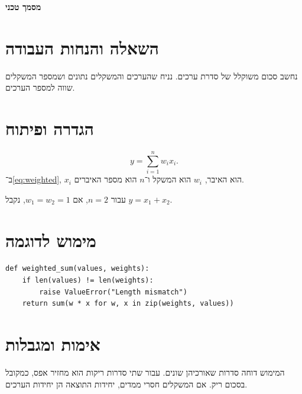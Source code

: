 \def\lakitdocumentclass{article}
\def\lakitclassoptions{11pt,a4paper}
\def\lakitgeometryoptions{margin=2.1cm,headheight=14pt}
\def\lakitlinespread{1.18}
\def\lakitparagraphstyle{block}




{\LARGE\sffamily\bfseries\noindent מסמך טכני\par}\medskip
\section{השאלה והנחות העבודה}
נחשב סכום משוקלל של סדרת ערכים. נניח שהערכים והמשקלים נתונים ושמספר
המשקלים שווה למספר הערכים.
\section{הגדרה ופיתוח}
\begin{equation}\label{eq:weighted}
y=\sum_{i=1}^{n}w_i x_i.
\end{equation}
ב־\eqref{eq:weighted}, $x_i$ הוא האיבר, $w_i$ הוא המשקל ו־$n$ הוא מספר
האיברים.
\begin{exbox}[frametitle={בדיקה פשוטה}]
עבור $n=2$, אם $w_1=w_2=1$, נקבל $y=x_1+x_2$.
\end{exbox}
\section{מימוש לדוגמה}
\begin{codebox}[frametitle={\en{Python}}]
\begin{asmblock}
\begin{lstlisting}[style=pystyle]
def weighted_sum(values, weights):
    if len(values) != len(weights):
        raise ValueError("Length mismatch")
    return sum(w * x for w, x in zip(weights, values))
\end{lstlisting}
\end{asmblock}
\end{codebox}
\section{אימות ומגבלות}
המימוש דוחה סדרות שאורכיהן שונים. עבור שתי סדרות ריקות הוא מחזיר אפס,
כמקובל בסכום ריק. אם המשקלים חסרי ממדים, יחידות התוצאה הן יחידות הערכים.

